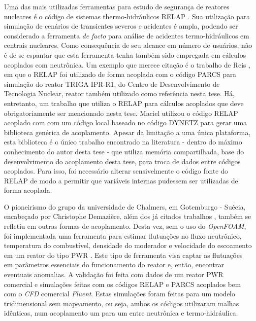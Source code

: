 Uma das mais utilizadas ferramentas para estudo de segurança de reatores nucleares é o
código de sistemas thermo-hidráulicos RELAP \cite{Relap2003}. Sua utilização para simulação
de cenários de transientes severos e acidentes é ampla, podendo ser considerado a
ferramenta \textit{de facto} para análise de acidentes termo-hidráulicos em centrais nucleares.
Como consequência de seu alcance em número de usuários, não é de se espantar que esta ferramenta
tenha também sido empregada em cálculos acoplados com neutrônica. Um exemplo que merece citação
é o trabalho de Reis \cite{Reis2015}, em que o RELAP foi utilizado de forma acoplada com
o código PARCS para simulação do reator TRIGA IPR-R1, do Centro de Desenvolvimento de
Tecnologia Nuclear, reator também utilizado como referência nesta tese. Há, entretanto, um
trabalho que utiliza o RELAP para cálculos acoplados que deve obrigatoriamente ser
mencionado nesta tese. Maciel \cite{Maciel2011} utilizou o código RELAP acoplado com
com um código local baseado no código DYNETZ para gerar uma biblioteca genérica de
acoplamento. Apesar da limitação a uma única plataforma, esta biblioteca é o único trabalho
encontrado na literatura - dentro do máximo conhecimento do autor desta tese - que utiliza
memória compartilhada, base do desenvolvimento do acoplamento desta tese, para troca
de dados entre códigos acoplados. Para isso, foi necessário alterar sensivelmente
o código fonte do RELAP de modo a permitir que variáveis internas pudessem ser utilizadas
de forma acoplada. 

O pioneirismo do grupo da universidade de Chalmers, em Gotemburgo - Suécia, encabeçado
por Christophe Demazière, além dos já citados trabalhos \cite{Jareteg2012, Jareteg2014},
também se refletiu em outras formas de acoplamento. Desta vez, sem o uso do \textit{OpenFOAM},
foi implementada uma ferramenta para estimar flutuações no fluxo neutrônico, temperatura
do combustível, densidade do moderador e velocidade do escoamento em um reator do tipo PWR
\cite{Larsson2012}. Este tipo de ferramenta visa captar as flutuações em parâmetros
essenciais do funcionamento do reator e, então, encontrar eventuais anomalias. A validação
foi feita com dados de um reator PWR comercial e simulações feitas com os códigos
RELAP e PARCS acoplados bem com o \textit{CFD} comercial \textit{Fluent}. Estas simulações
foram feitas para um modelo tridimensional sem mapeamento, ou seja, ambos os códigos
utilizaram malhas idênticas, num acoplamento um para um entre neutrônica e termo-hidráulica.

